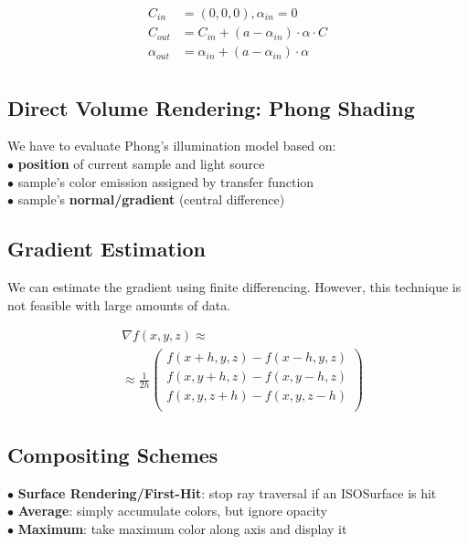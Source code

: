 \begin{align*}
    C_{in} &= (0,0,0), \alpha_{in} = 0                         \\
    C_{out} &= C_{in} + (a - \alpha_{in}) \cdot \alpha \cdot C \\
    \alpha_{out} &= \alpha_{in} + (a - \alpha_{in}) \cdot \alpha    \\
\end{align*}



\begin{center}
\end{center}

\subsection{Direct Volume Rendering: Phong Shading}
We have to evaluate Phong's illumination model based on: \\
$\bullet$ \textbf{position} of current sample and light source \\
$\bullet$ sample's \textnormal{color} emission assigned by transfer function \\
$\bullet$ sample's \textbf{normal/gradient} (central difference)

\subsection{Gradient Estimation}
We can estimate the gradient using finite differencing. However, this technique is not feasible with large amounts of data.

\begin{align*}
    & \nabla f(x, y, z) \approx \\
    & \approx \frac{1}{2h} \begin{pmatrix}
        f(x + h, y, z) - f(x - h, y, z) \\
        f(x, y + h, z) - f(x, y - h, z) \\
        f(x, y, z + h) - f(x, y, z - h) \\
    \end{pmatrix}
\end{align*}

\subsection{Compositing Schemes}
$\bullet$ \textbf{Surface Rendering/First-Hit}: stop ray traversal if an ISOSurface is hit \\
$\bullet$ \textbf{Average}: simply accumulate colors, but ignore opacity \\
$\bullet$ \textbf{Maximum}: take maximum color along axis and display it